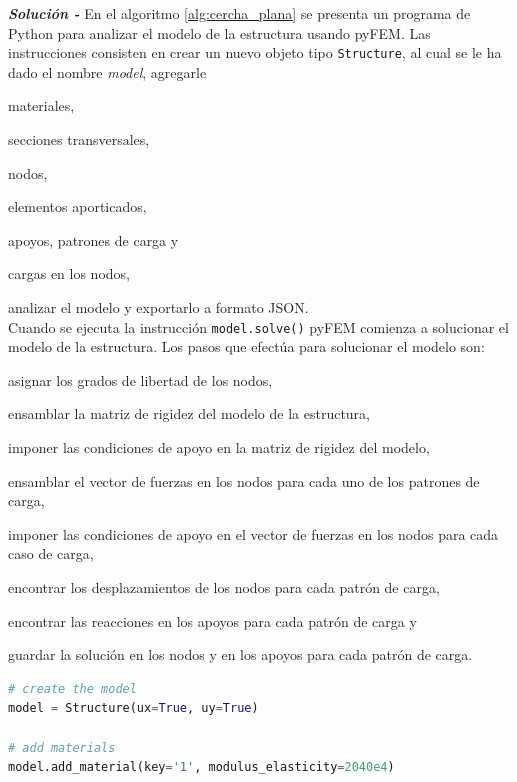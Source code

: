 \begin{ejemplo}
  \emph{\textbf{Solución -}} En el algoritmo \ref{alg:cercha_plana} se presenta un programa de Python para analizar el modelo de la estructura usando pyFEM. Las instrucciones consisten en crear un nuevo objeto tipo \verb|Structure|, al cual se le ha dado el nombre \emph{model}, agregarle
  \begin{inparaenum}[$ (a) $]
  \item materiales,
  \item secciones transversales,
  \item nodos,
  \item elementos aporticados,
  \item apoyos, patrones de carga y
  \item cargas en los nodos,
  \end{inparaenum}
  analizar el modelo y exportarlo a formato JSON.\\

  Cuando se ejecuta la instrucción \verb|model.solve()| pyFEM comienza a solucionar el modelo de la estructura. Los pasos que efectúa para solucionar el modelo son:
  \begin{inparaenum}[$ (1) $]
  \item asignar los grados de libertad de los nodos, 
  \item ensamblar la matriz de rigidez del modelo de la estructura, 
  \item imponer las condiciones de apoyo en la matriz de rigidez del modelo, 
  \item ensamblar el vector de fuerzas en los nodos para cada uno de los patrones de carga, 
  \item imponer las condiciones de apoyo en el vector de fuerzas en los nodos para cada caso de carga, 
  \item encontrar los desplazamientos de los nodos para cada patrón de carga, 
  \item encontrar las reacciones en los apoyos para cada patrón de carga y
  \item guardar la solución en los nodos y en los apoyos para cada patrón de carga.
  \end{inparaenum}
  
  \begin{lstlisting}[language=Python,caption=Ingreso de los datos del modelo de la estructura a \textit{pyFEM}.,label=alg:cercha_plana, frame=single]
# create the model
model = Structure(ux=True, uy=True)

# add materials
model.add_material(key='1', modulus_elasticity=2040e4)


\end{lstlisting}
\end{ejemplo}

